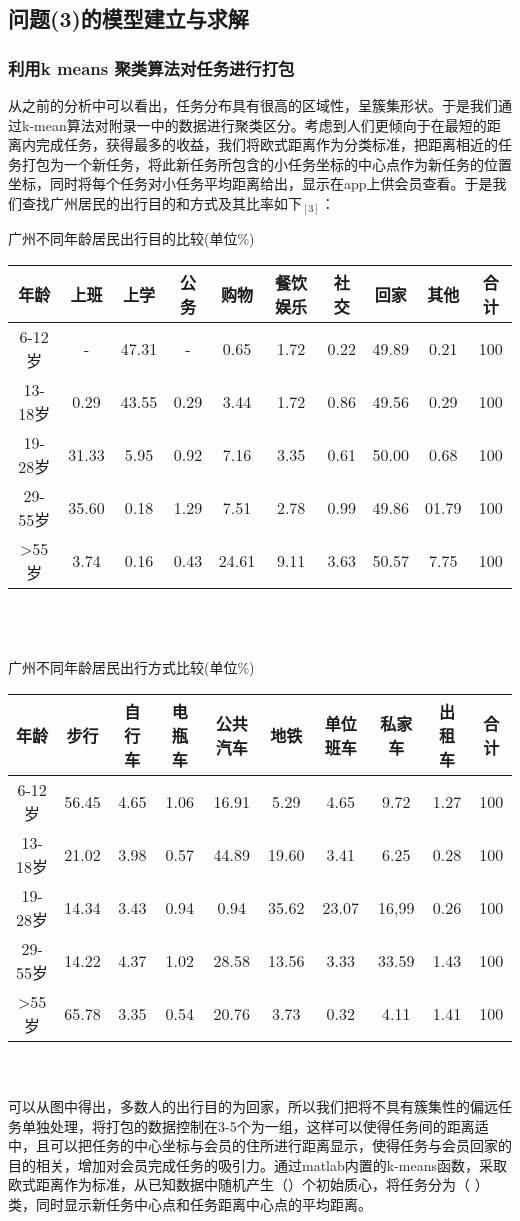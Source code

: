 \documentclass{ctexart}
\begin{document}
\subsection{问题(3)的模型建立与求解}
\subsubsection{利用k means 聚类算法对任务进行打包}
从之前的分析中可以看出，任务分布具有很高的区域性，呈簇集形状。于是我们通过k-mean算法对附录一中的数据进行聚类区分。考虑到人们更倾向于在最短的距离内完成任务，获得最多的收益，我们将欧式距离作为分类标准，把距离相近的任务打包为一个新任务，将此新任务所包含的小任务坐标的中心点作为新任务的位置坐标，同时将每个任务对小任务平均距离给出，显示在app上供会员查看。于是我们查找广州居民的出行目的和方式及其比率如下$_{[3]}$：
\\
\centerline{广州不同年龄居民出行目的比较(单位\%)}

\begin{tabular}{|cccccccccc|}

\hline
年龄 &上班&上学&公务&购物&餐饮娱乐&社交&回家&其他&合计\\
\hline
6-12岁 &-&47.31&-&0.65&1.72&0.22&49.89&0.21&100\\
\hline
13-18岁 &0.29&43.55&0.29&3.44&1.72&0.86&49.56&0.29&100\\
\hline
19-28岁 &31.33&5.95&0.92&7.16&3.35&0.61&50.00&0.68&100\\
\hline
29-55岁 &35.60&0.18&1.29&7.51&2.78&0.99&49.86&01.79&100\\
\hline
>55岁 &3.74&0.16&0.43&24.61&9.11&3.63&50.57&7.75&100\\
\hline
\end{tabular}
\\
\\
\centerline{广州不同年龄居民出行方式比较(单位\%)}

\begin{tabular}{|cccccccccc|}

\hline
年龄 &步行&自行车&电瓶车&公共汽车&地铁&单位班车&私家车&出租车&合计\\
\hline
6-12岁 &56.45&4.65&1.06&16.91&5.29&4.65&9.72&1.27&100\\
\hline
13-18岁 &21.02&3.98&0.57&44.89&19.60&3.41&6.25&0.28&100\\
\hline
19-28岁 &14.34&3.43&0.94&0.94&35.62&23.07&16,99&0.26&100\\
\hline
29-55岁 &14.22&4.37&1.02&28.58&13.56&3.33&33.59&1.43&100\\
\hline
>55岁 &65.78&3.35&0.54&20.76&3.73&0.32&4.11&1.41&100\\
\hline
\end{tabular}
\\
\\
可以从图中得出，多数人的出行目的为回家，所以我们把将不具有簇集性的偏远任务单独处理，将打包的数据控制在3-5个为一组，这样可以使得任务间的距离适中，且可以把任务的中心坐标与会员的住所进行距离显示，使得任务与会员回家的目的相关，增加对会员完成任务的吸引力。通过matlab内置的k-means函数，采取欧式距离作为标准，从已知数据中随机产生（）个初始质心，将任务分为（ ）类，同时显示新任务中心点和任务距离中心点的平均距离。
\end{document}
